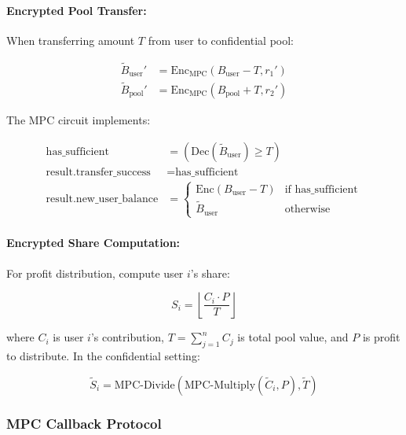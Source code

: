 \documentclass[11pt,a4paper]{article}
\begin{document}
\paragraph{Encrypted Pool Transfer:} When transferring amount $T$ from user to confidential pool:

\begin{align}
\widetilde{B}_{\text{user}}' &= \text{Enc}_{\text{MPC}}(B_{\text{user}} - T, r_1') \\
\widetilde{B}_{\text{pool}}' &= \text{Enc}_{\text{MPC}}(B_{\text{pool}} + T, r_2')
\end{align}

The MPC circuit implements:

\begin{equation}
\begin{aligned}
\text{has\_sufficient} &= (\text{Dec}(\widetilde{B}_{\text{user}}) \geq T) \\
\text{result.transfer\_success} &= \text{has\_sufficient} \\
\text{result.new\_user\_balance} &= \begin{cases}
\text{Enc}(B_{\text{user}} - T) & \text{if has\_sufficient} \\
\widetilde{B}_{\text{user}} & \text{otherwise}
\end{cases}
\end{aligned}
\end{equation}

\paragraph{Encrypted Share Computation:} For profit distribution, compute user $i$'s share:

\begin{equation}
S_i = \left\lfloor \frac{C_i \cdot P}{T} \right\rfloor
\end{equation}

where $C_i$ is user $i$'s contribution, $T = \sum_{j=1}^{n} C_j$ is total pool value, and $P$ is profit to distribute. In the confidential setting:

\begin{equation}
\widetilde{S}_i = \text{MPC-Divide}(\text{MPC-Multiply}(\widetilde{C}_i, P), \widetilde{T})
\end{equation}

\subsubsection{MPC Callback Protocol}
\end{document}
